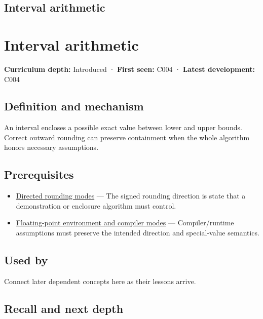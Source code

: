 \hypertarget{appendix-1823a14330cb}{}
\section*{Interval arithmetic}
\chapter{Interval arithmetic}\label{appendix-1823a14330cb-interval-arithmetic}

\textbf{Curriculum depth:} Introduced · \textbf{First seen:} C004 · \textbf{Latest development:} C004

\section{Definition and mechanism}\label{appendix-1823a14330cb-definition-and-mechanism}

An interval encloses a possible exact value between lower and upper bounds. Correct outward rounding can preserve containment when the whole algorithm honors necessary assumptions.

\section{Prerequisites}\label{appendix-1823a14330cb-prerequisites}

\begin{itemize}
\tightlist
\item
  \hyperref[appendix-637d164ae5ca]{Directed rounding modes} --- The signed rounding direction is state that a demonstration or enclosure algorithm must control.
\item
  \hyperref[appendix-f11d1a521253]{Floating-point environment and compiler modes} --- Compiler/runtime assumptions must preserve the intended direction and special-value semantics.
\end{itemize}

\section{Used by}\label{appendix-1823a14330cb-used-by}

Connect later dependent concepts here as their lessons arrive.

\section{Recall and next depth}\label{appendix-1823a14330cb-recall-and-next-depth}

